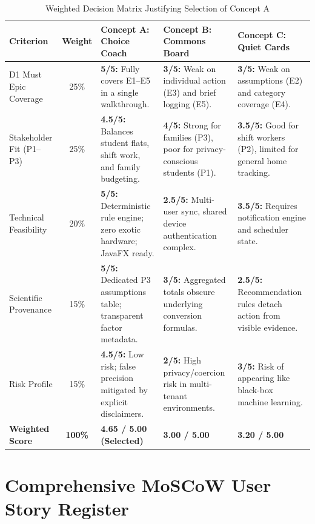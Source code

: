 \documentclass[12pt,a4paper]{article}
\begin{document}
\begin{table}[ht]
\centering
\small
\caption{Weighted Decision Matrix Justifying Selection of Concept A}
\begin{tabularx}{\textwidth}{@{}lcp{4.2cm}p{4.2cm}p{4.2cm}@{}}
\toprule
\textbf{Criterion} & \textbf{Weight} & \textbf{Concept A: Choice Coach} & \textbf{Concept B: Commons Board} & \textbf{Concept C: Quiet Cards}\\
\midrule
D1 Must Epic Coverage & 25\% & \textbf{5/5:} Fully covers E1--E5 in a single walkthrough. & \textbf{3/5:} Weak on individual action (E3) and brief logging (E5). & \textbf{3/5:} Weak on assumptions (E2) and category coverage (E4).\\
Stakeholder Fit (P1--P3) & 25\% & \textbf{4.5/5:} Balances student flats, shift work, and family budgeting. & \textbf{4/5:} Strong for families (P3), poor for privacy-conscious students (P1). & \textbf{3.5/5:} Good for shift workers (P2), limited for general home tracking.\\
Technical Feasibility & 20\% & \textbf{5/5:} Deterministic rule engine; zero exotic hardware; JavaFX ready. & \textbf{2.5/5:} Multi-user sync, shared device authentication complex. & \textbf{3.5/5:} Requires notification engine and scheduler state.\\
Scientific Provenance & 15\% & \textbf{5/5:} Dedicated P3 assumptions table; transparent factor metadata. & \textbf{3/5:} Aggregated totals obscure underlying conversion formulas. & \textbf{2.5/5:} Recommendation rules detach action from visible evidence.\\
Risk Profile & 15\% & \textbf{4.5/5:} Low risk; false precision mitigated by explicit disclaimers. & \textbf{2/5:} High privacy/coercion risk in multi-tenant environments. & \textbf{3/5:} Risk of appearing like black-box machine learning.\\
\midrule
\textbf{Weighted Score} & \textbf{100\%} & \textbf{4.65 / 5.00 (Selected)} & \textbf{3.00 / 5.00} & \textbf{3.20 / 5.00}\\
\bottomrule
\end{tabularx}
\end{table}

\section{Comprehensive MoSCoW User Story Register}
\end{document}

